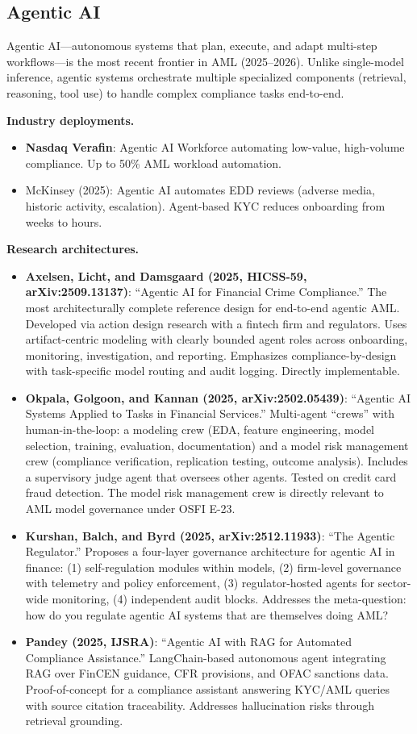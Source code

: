 \documentclass[11pt]{article}
\begin{document}
\subsection{Agentic AI}

Agentic AI---autonomous systems that plan, execute, and adapt multi-step workflows---is the most recent frontier in AML (2025--2026). Unlike single-model inference, agentic systems orchestrate multiple specialized components (retrieval, reasoning, tool use) to handle complex compliance tasks end-to-end.

\textbf{Industry deployments.}
\begin{itemize}
\item \textbf{Nasdaq Verafin}: Agentic AI Workforce automating low-value, high-volume compliance. Up to 50\% AML workload automation.
\item McKinsey (2025): Agentic AI automates EDD reviews (adverse media, historic activity, escalation). Agent-based KYC reduces onboarding from weeks to hours.
\end{itemize}

\textbf{Research architectures.}
\begin{itemize}
\item \textbf{Axelsen, Licht, and Damsgaard (2025, HICSS-59, arXiv:2509.13137)}: ``Agentic AI for Financial Crime Compliance.'' The most architecturally complete reference design for end-to-end agentic AML. Developed via action design research with a fintech firm and regulators. Uses artifact-centric modeling with clearly bounded agent roles across onboarding, monitoring, investigation, and reporting. Emphasizes compliance-by-design with task-specific model routing and audit logging. Directly implementable.
\item \textbf{Okpala, Golgoon, and Kannan (2025, arXiv:2502.05439)}: ``Agentic AI Systems Applied to Tasks in Financial Services.'' Multi-agent ``crews'' with human-in-the-loop: a modeling crew (EDA, feature engineering, model selection, training, evaluation, documentation) and a model risk management crew (compliance verification, replication testing, outcome analysis). Includes a supervisory judge agent that oversees other agents. Tested on credit card fraud detection. The model risk management crew is directly relevant to AML model governance under OSFI E-23.
\item \textbf{Kurshan, Balch, and Byrd (2025, arXiv:2512.11933)}: ``The Agentic Regulator.'' Proposes a four-layer governance architecture for agentic AI in finance: (1) self-regulation modules within models, (2) firm-level governance with telemetry and policy enforcement, (3) regulator-hosted agents for sector-wide monitoring, (4) independent audit blocks. Addresses the meta-question: how do you regulate agentic AI systems that are themselves doing AML?
\item \textbf{Pandey (2025, IJSRA)}: ``Agentic AI with RAG for Automated Compliance Assistance.'' LangChain-based autonomous agent integrating RAG over FinCEN guidance, CFR provisions, and OFAC sanctions data. Proof-of-concept for a compliance assistant answering KYC/AML queries with source citation traceability. Addresses hallucination risks through retrieval grounding.
\end{itemize}
\end{document}
